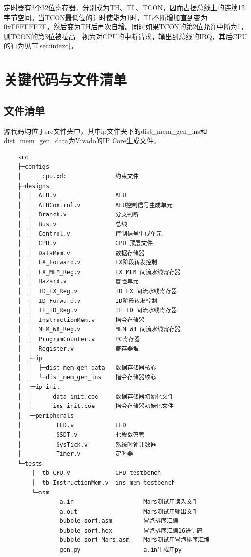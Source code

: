 \documentclass[a4paper]{article}
\begin{document}
定时器有3个32位寄存器，分别成为TH、TL、TCON，因而占据总线上的连续12字节空间。当TCON最低位的计时使能为1时，TL不断增加直到变为0xFFFFFFFF，然后变为TH后再次自增。同时如果TCON的第2位允许中断为1，则TCON的第3位被拉高，视为对CPU的中断请求，输出到总线的IRQ，其后CPU的行为见节\ref{sec:intexc}。

\section{关键代码与文件清单}

\subsection{文件清单}

源代码均位于src文件夹中，其中ip文件夹下的dist\_mem\_gen\_ins和dist\_mem\_gen\_data为Vivado的IP Core生成文件。

\begin{verbatim}
    src
    ├─configs
    │      cpu.xdc              约束文件
    ├─designs
    │  │  ALU.v                 ALU
    │  │  ALUControl.v          ALU控制信号生成单元
    │  │  Branch.v              分支判断
    │  │  Bus.v                 总线
    │  │  Control.v             控制信号生成单元
    │  │  CPU.v                 CPU 顶层文件
    │  │  DataMem.v             数据存储器
    │  │  EX_Forward.v          EX阶段转发控制
    │  │  EX_MEM_Reg.v          EX MEM 间流水线寄存器
    │  │  Hazard.v              冒险单元
    │  │  ID_EX_Reg.v           ID EX 间流水线寄存器
    │  │  ID_Forward.v          ID阶段转发控制
    │  │  IF_ID_Reg.v           IF ID 间流水线寄存器
    │  │  InstructionMem.v      指令存储器
    │  │  MEM_WB_Reg.v          MEM WB 间流水线寄存器
    │  │  ProgramCounter.v      PC寄存器
    │  │  Register.v            寄存器堆
    │  ├─ip
    │  │  ├─dist_mem_gen_data   数据存储器核心
    │  │  └─dist_mem_gen_ins    指令存储器核心
    │  ├─ip_init
    │  │      data_init.coe     数据存储器初始化文件
    │  │      ins_init.coe      指令存储器初始化文件
    │  └─peripherals
    │          LED.v            LED
    │          SSDT.v           七段数码管
    │          SysTick.v        系统时钟计数器
    │          Timer.v          定时器
    └─tests
        │  tb_CPU.v             CPU testbench
        │  tb_InstructionMem.v  ins_mem testbench
        └─asm
                a.in                    Mars测试用读入文件
                a.out                   Mars测试用输出文件
                bubble_sort.asm         冒泡排序汇编
                bubble_sort.hex         冒泡排序汇编16进制码
                bubble_sort_Mars.asm    Mars测试用冒泡排序汇编
                gen.py                  a.in生成用py
\end{verbatim}
\end{document}
